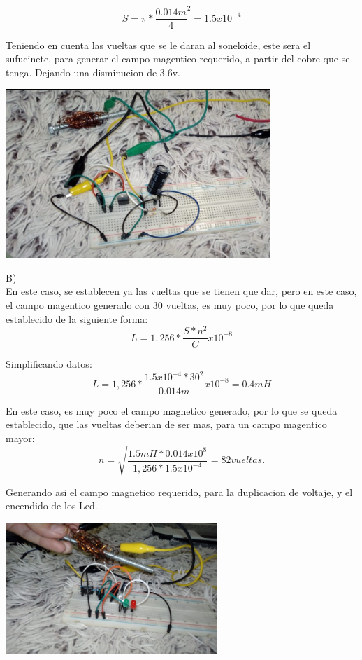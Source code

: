 \documentclass[12pt,a4paper]{article}
\begin{document}
$$ S=\pi * \frac{0.014m}{4}^{2}= 1.5x10^{-4} $$

Teniendo en cuenta las vueltas que se le daran al soneloide, este sera el sufucinete, para generar el campo magentico requerido, a partir del cobre que se tenga. Dejando una disminucion de 3.6v.\\

\begin{center}
\includegraphics[width=10cm]{resul1.jpeg} 
\end{center}

B)\\

En este caso, se establecen ya las vueltas que se tienen que dar, pero en este caso, el campo magentico generado con 30 vueltas, es muy poco, por lo que queda establecido de la siguiente forma:\\
$$ L=1,256* \frac{S * n^{2}}{C}x10^{-8} $$

Simplificando datos:\\
$$ L=1,256* \frac{1.5x10^{-4} * 30^{2}}{0.014m}x10^{-8}= 0.4mH $$

En este caso, es muy poco el campo magnetico generado, por lo que se queda establecido, que las vueltas deberian de ser mas, para un campo magentico mayor:\\
$$ n=\sqrt{\frac{1.5mH*0.014x10^{8}}{1,256 * 1.5x10^{-4}}}= 82 vueltas. $$

Generando asi el campo magnetico requerido, para la duplicacion de voltaje, y el encendido de los Led.\\

\begin{center}
\includegraphics[width=8cm]{resul2.jpeg} 
\end{center}
\end{document}

